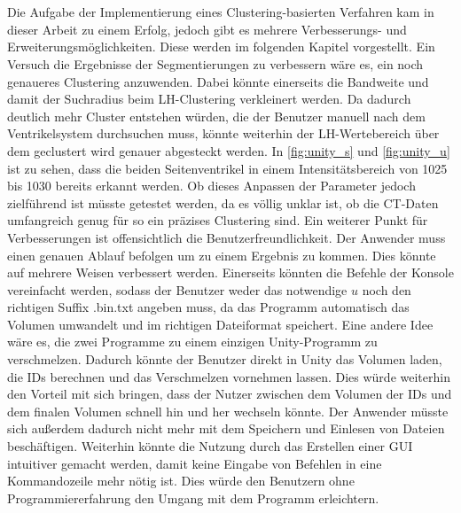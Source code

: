 \chapter{}
\label{sec:conclusion}



Die Aufgabe der Implementierung eines Clustering-basierten Verfahren kam in dieser Arbeit zu einem Erfolg, jedoch gibt es mehrere Verbesserungs- und Erweiterungsmöglichkeiten. Diese werden im folgenden Kapitel vorgestellt.
\newline
Ein Versuch die Ergebnisse der Segmentierungen zu verbessern wäre es, ein noch genaueres Clustering anzuwenden. Dabei könnte einerseits die Bandweite und damit der Suchradius beim LH-Clustering verkleinert werden. Da dadurch deutlich mehr Cluster entstehen würden, die der Benutzer manuell nach dem Ventrikelsystem durchsuchen muss, könnte weiterhin der LH-Wertebereich über dem geclustert wird genauer abgesteckt werden. In \autoref{fig:unity_s} und \autoref{fig:unity_u} ist zu sehen, dass die beiden Seitenventrikel in einem Intensitätsbereich von 1025 bis 1030 bereits erkannt werden. Ob dieses Anpassen der Parameter jedoch zielführend ist müsste getestet werden, da es völlig unklar ist, ob die CT-Daten umfangreich genug für so ein präzises Clustering sind.
\newline
Ein weiterer Punkt für Verbesserungen ist offensichtlich die Benutzerfreundlichkeit. Der Anwender muss einen genauen Ablauf befolgen um zu einem Ergebnis zu kommen. Dies könnte auf mehrere Weisen verbessert werden. Einerseits könnten die Befehle der Konsole vereinfacht werden, sodass der Benutzer weder das notwendige $u$ noch den richtigen Suffix .bin.txt  angeben muss, da das Programm automatisch das Volumen umwandelt und im richtigen Dateiformat speichert.
\newline
Eine andere Idee wäre es, die zwei Programme zu einem einzigen Unity-Programm zu verschmelzen. Dadurch könnte der Benutzer direkt in Unity das Volumen laden, die IDs berechnen und das Verschmelzen vornehmen lassen. Dies würde weiterhin den Vorteil mit sich bringen, dass der Nutzer zwischen dem Volumen der IDs und dem finalen Volumen schnell hin und her wechseln könnte. Der Anwender müsste sich außerdem dadurch nicht mehr mit dem Speichern und Einlesen von Dateien beschäftigen. Weiterhin könnte die Nutzung durch das Erstellen einer GUI intuitiver gemacht werden, damit keine Eingabe von Befehlen in eine Kommandozeile mehr nötig ist. Dies würde den Benutzern ohne Programmiererfahrung den Umgang mit dem Programm erleichtern.
